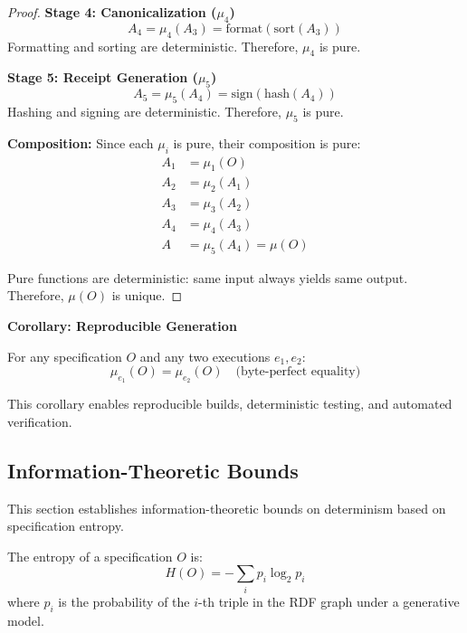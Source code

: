 \begin{proof}
    \textbf{Stage 4: Canonicalization (\(\mu_4\))}
    \begin{equation}
        A_4 = \mu_4(A_3) = \text{format}(\text{sort}(A_3))
    \end{equation}
    Formatting and sorting are deterministic. Therefore, \(\mu_4\) is pure.

    \textbf{Stage 5: Receipt Generation (\(\mu_5\))}
    \begin{equation}
        A_5 = \mu_5(A_4) = \text{sign}(\text{hash}(A_4))
    \end{equation}
    Hashing and signing are deterministic. Therefore, \(\mu_5\) is pure.

    \textbf{Composition:} Since each \(\mu_i\) is pure, their composition is pure:
    \begin{align}
        A_1 &= \mu_1(O) \\
        A_2 &= \mu_2(A_1) \\
        A_3 &= \mu_3(A_2) \\
        A_4 &= \mu_4(A_3) \\
        A   &= \mu_5(A_4) = \mu(O)
    \end{align}

    Pure functions are deterministic: same input always yields same output. Therefore, \(\mu(O)\) is unique.
\end{proof}

\textbf{Corollary: Reproducible Generation}

For any specification \(O\) and any two executions \(e_1, e_2\):
\begin{equation}
    \mu_{e_1}(O) = \mu_{e_2}(O) \quad \text{(byte-perfect equality)}
\end{equation}

This corollary enables reproducible builds, deterministic testing, and automated verification.

\subsection{Information-Theoretic Bounds}

This section establishes information-theoretic bounds on determinism based on specification entropy.

\begin{definition}
    The entropy of a specification \(O\) is:
    \begin{equation}
        H(O) = -\sum_{i} p_i \log_2 p_i
    \end{equation}
    where \(p_i\) is the probability of the \(i\)-th triple in the RDF graph under a generative model.
\end{definition}

